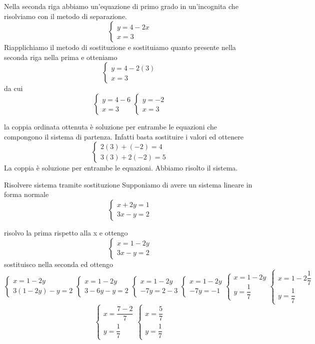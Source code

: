 Nella seconda riga abbiamo un'equazione di primo grado in un'incognita che risolviamo con il metodo di separazione.
\[ 
\begin{cases}
	y=4-2x\\
	x=3
\end{cases}\]
Riapplichiamo il metodo di sostituzione e sostituiamo quanto presente nella seconda riga nella prima e otteniamo
\[ 
\begin{cases}
y=4-2(3)\\
x=3
\end{cases}\]
da cui
\[ 
\begin{cases}
y=4-6\\
x=3
\end{cases}
\begin{cases}
y=-2\\
x=3
\end{cases}\]

la coppia ordinata ottenuta è soluzione per entrambe le equazioni che compongono il sistema di partenza. Infatti basta sostituire i valori ed ottenere
	\[
\begin{cases}
2(3)+(-2)=4\\
3(3)+2(-2)=5
\end{cases}
\]
La coppia è soluzione per entrambe le equazioni. Abbiamo risolto il sistema.
\begin{esempiot}{Risolvere sistema tramite sostituzione}{}
Supponiamo di avere un sistema lineare in forma normale
\[
\begin{cases}
	x+2y=1\\
	3x-y=2
\end{cases}
\]
\end{esempiot}
risolvo la prima rispetto alla x e ottengo 
\[
\begin{cases}
	x=1-2y\\
	3x-y=2
\end{cases}
\]
sostituisco nella seconda ed ottengo
\[
\begin{cases}
	x=1-2y\\
	3(1-2y)-y=2
\end{cases}
\begin{cases}
	x=1-2y\\
	3-6y-y=2
\end{cases}
\begin{cases}
	x=1-2y\\
	-7y=2-3
\end{cases}
\begin{cases}
	x=1-2y\\
	-7y=-1
\end{cases}
\begin{cases}
	x=1-2y\\
	y=\dfrac{1}{7}
\end{cases}
\begin{cases}
	x=1-2\dfrac{1}{7}\\
	y=\dfrac{1}{7}
\end{cases}
\]
\[
\begin{cases}
	x=\dfrac{7-2}{7} \\
	y=\dfrac{1}{7}
\end{cases}
\begin{cases}
	x=\dfrac{5}{7}\\
	y=\dfrac{1}{7}
\end{cases}
\]
